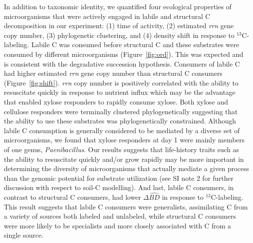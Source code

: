 In addition to taxonomic identity, we quantified four ecological properties of
microorganisms that were actively engaged in labile and structural C
decomposition in our experiment: (1) time of activity, (2) estimated
\textit{rrn} gene copy number, (3) phylogenetic clustering, and (4) density
shift in response to $^{13}$C-labeling. Labile C was consumed before structural C and 
these substrates were consumed by different microorganisms
(Figure~\ref{fig:ord}). This was expected and is consistent with the
degradative succession hypothesis. Consumers of
labile C had higher estimated \textit{rrn}
gene copy number than structural C consumers (Figure~\ref{fig:shift}).  \textit{rrn} copy number is
positively correlated with the ability to resuscitate quickly in response to
nutrient influx \citep{Klappenbach_2000} which may be the advantage that
enabled xylose responders to rapidly consume xylose. Both xylose and cellulose
responders were terminally clustered phylogenetically suggesting that the ability
to use these substrates was phylogenetically constrained. Although labile C
consumption is generally considered to be mediated by a diverse set of 
microorganisms, we found that xylose responders at day 1 were mainly members of
one genus, \textit{Paenibacillus}. Our results suggests that life-history
traits such as the ability to resuscitate
quickly and/or grow rapidly may be more important in determining the
diversity of microorganisms that actually mediate a given process than the genomic
potential for substrate utilization (see SI note 2 for further discussion with respect to
soil-C modelling). And last, labile C consumers, in contrast to structural C consumers, 
had lower $\Delta\hat{BD}$ in response to $^{13}$C-labeling.
This result suggests that labile C consumers were generalists, assimilating C
from a variety of sources both labeled and unlabeled, while structural C
consumers were more likely to be specialists and more closely associated
with C from a single source.

